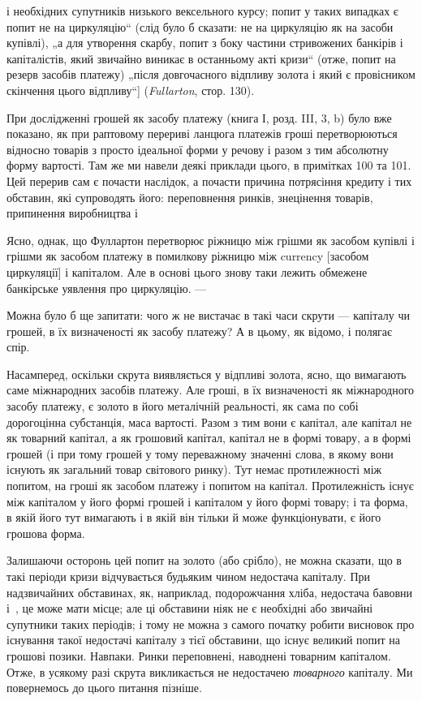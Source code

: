 \parcont{}  %
і необхідних супутників низького вексельного курсу; попит у таких
випадках є попит не на циркуляцію“ (слід було б сказати:
не на циркуляцію як на засоби купівлі), „а для утворення скарбу,
попит з боку частини стривожених банкірів і капіталістів, який
звичайно виникає в останньому акті кризи“ (отже, попит на резерв
засобів платежу) „після довгочасного відпливу золота і який є
провісником скінчення цього відпливу“] (\emph{Fullarton}, стор. 130).

При дослідженні грошей як засобу платежу (книга І, розд. III,
3, b) було вже показано, як при раптовому перериві ланцюга платежів
гроші перетворюються відносно товарів з просто ідеальної
форми у речову і разом з тим абсолютну форму вартості.
Там же ми навели деякі приклади цього, в примітках 100 та 101.
Цей перерив сам є почасти наслідок, а почасти причина потрясіння
кредиту і тих обставин, які супроводять його: переповнення
ринків, знецінення товарів, припинення виробництва і~

Ясно, однак, що Фуллартон перетворює ріжницю між грішми як
засобом купівлі і грішми як засобом платежу в помилкову ріжницю
між currency [засобом циркуляції] і капіталом. Але в основі
цього знову таки лежить обмежене банкірське уявлення про
циркуляцію. —

Можна було б ще запитати: чого ж не вистачає в такі часи
скрути — капіталу чи грошей, в їх визначеності як засобу платежу?
А в цьому, як відомо, і полягає спір.

Насамперед, оскільки скрута виявляється у відпливі золота,
ясно, що вимагають саме міжнародних засобів платежу. Але
гроші, в їх визначеності як міжнародного засобу платежу, є
золото в його металічній реальності, як сама по собі дорогоцінна
субстанція, маса вартості. Разом з тим вони є капітал, але капітал
не як товарний капітал, а як грошовий капітал, капітал не
в формі товару, а в формі грошей (і при тому грошей у тому
переважному значенні слова, в якому вони існують як загальний
товар світового ринку). Тут немає протилежності між попитом,
на гроші як засобом платежу і попитом на капітал. Протилежність
існує між капіталом у його формі грошей і капіталом у
його формі товару; і та форма, в якій його тут вимагають і в
якій він тільки й може функціонувати, є його грошова форма.

Залишаючи осторонь цей попит на золото (або срібло), не
можна сказати, що в такі періоди кризи відчувається будьяким
чином недостача капіталу. При надзвичайних обставинах, як,
наприклад, подорожчання хліба, недостача бавовни і~, це
може мати місце; але ці обставини ніяк не є необхідні або звичайні
супутники таких періодів; і тому не можна з самого початку
робити висновок про існування такої недостачі капіталу
з тієї обставини, що існує великий попит на грошові позики.
Навпаки. Ринки переповнені, наводнені товарним капіталом.
Отже, в усякому разі скрута викликається не недостачею \emph{товарного}
капіталу. Ми повернемось до цього питання пізніше.
\parbreak{}  %
